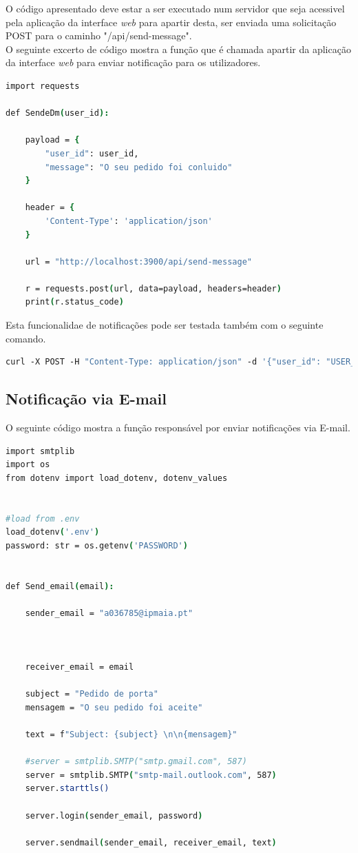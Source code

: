 O código apresentado deve estar a ser executado num servidor que seja acessivel pela
aplicação da interface \textit{web} para apartir desta, ser enviada uma solicitação POST
para o caminho "/api/send-message". \\

O seguinte excerto de código mostra a função que é chamada apartir da aplicação
da interface \textit{web} para enviar notificação para os utilizadores.
\begin{lstlisting}[language=csh, caption={Solicitação para enviar mensagem}]
import requests

def SendeDm(user_id):

    payload = {
        "user_id": user_id,
        "message": "O seu pedido foi conluido"
    }
    
    header = {
        'Content-Type': 'application/json'
    }

    url = "http://localhost:3900/api/send-message"
    
    r = requests.post(url, data=payload, headers=header)
    print(r.status_code)
\end{lstlisting}

Esta funcionalidae de notificações pode ser testada também com o seguinte comando.
\begin{lstlisting}[language=csh, caption={Teste de notificação via Microsoft Teams}]
    curl -X POST -H "Content-Type: application/json" -d '{"user_id": "USER_ID", "message": "conteudo da mensagem direta"}' http://localhost:3978/api/send-message
\end{lstlisting}


\subsection{Notificação via E-mail}

O seguinte código mostra a função responsável por enviar notificações via E-mail.

\begin{lstlisting}[language=csh, caption={Teste de notificação via Microsoft Teams}]
import smtplib
import os
from dotenv import load_dotenv, dotenv_values


#load from .env
load_dotenv('.env')
password: str = os.getenv('PASSWORD')


def Send_email(email):
    
    sender_email = "a036785@ipmaia.pt"

    
    
    receiver_email = email
    
    subject = "Pedido de porta"
    mensagem = "O seu pedido foi aceite"
    
    text = f"Subject: {subject} \n\n{mensagem}"
    
    #server = smtplib.SMTP("smtp.gmail.com", 587)
    server = smtplib.SMTP("smtp-mail.outlook.com", 587)
    server.starttls()
    
    server.login(sender_email, password)
    
    server.sendmail(sender_email, receiver_email, text)
    
        
\end{lstlisting}

